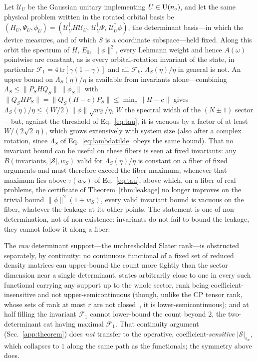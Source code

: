 %
%
%
%
%
%
%
%
%
%
%
%
%
%
%
%
\begin{proposition}
\label{prop:leakinv}
Let $\mathcal U_U$ be the Gaussian unitary implementing $U\in\mathrm U(n_{\rm o})$, and let the same
physical problem written in the rotated orbital basis be
$(H_U,\Psi_U,\phi_U)=(\mathcal U_U^{\dagger}H\mathcal U_U,\,\mathcal U_U^{\dagger}\Psi,\,
\mathcal U_U^{\dagger}\phi)$, the determinant basis---in which the device measures, and of which $S$ is a
coordinate subspace---held fixed. Along this orbit the spectrum of $H$, $E_0$, $\lVert\phi\rVert^{2}$,
every Lehmann weight and hence $A(\omega)$ pointwise are constant, as is every orbital-rotation invariant
of the state, in particular $\mathcal F_1=4\,\mathrm{tr}[\gamma(1-\gamma)]$ and all
$\mathcal F_k$. $\Lambda_S(\eta)/\eta$ in general is not. An upper bound on $\Lambda_S(\eta)/\eta$ is available from
invariants alone---combining $\Lambda_S\le\lVert P_SHQ_S\rVert\,\lVert\phi_S\rVert$ with
$\lVert Q_SHP_S\rVert=\lVert Q_S(H-c)P_S\rVert\le\min_c\lVert H-c\rVert$ gives
$\Lambda_S(\eta)/\eta\le(W/2)\lVert\phi\rVert\sqrt{w_S}/\eta$, $W$ the spectral width of the $(N\pm1)$
sector---but, against the threshold of Eq.~\eqref{eq:tau}, it is vacuous by a factor of at least
$W/(2\sqrt2\,\eta)$, which grows extensively with system size (also after a complex rotation, since
$\tilde\Lambda_S$ of Eq.~\eqref{eq:lambdatilde} obeys the same bound).
That no invariant bound can be useful on these fibers is seen at fixed invariants: any
$B(\text{invariants},|\mathcal S|,w_S)$ valid for $\Lambda_S(\eta)/\eta$ is constant on a fiber of fixed
arguments and must therefore exceed the fiber maximum; whenever that maximum lies above
$\tau(w_S)$ of Eq.~\eqref{eq:tau}, above which, on a fiber of real problems, the certificate of
Theorem~\ref{thm:leakage} no longer improves on the trivial bound $\lVert\phi\rVert^{2}(1+w_S)$, every valid invariant bound is
vacuous on the fiber, whatever the leakage at its other points. The statement is one of
non-determination, not of non-existence: invariants do not fail to bound the leakage, they cannot follow
it along a fiber.
\end{proposition}

The \emph{raw} determinant support---the unthresholded Slater rank---is obstructed separately, by
continuity: no continuous functional of a fixed set of reduced density matrices can upper-bound the
count more tightly than the sector dimension near a single determinant, states arbitrarily close to one
in every such functional carrying any support up to the whole sector, rank being coefficient-insensitive and
not upper-semicontinuous (though, unlike the CP tensor rank, whose sets of rank at most $r$ are not
closed~\cite{desilvalim2008}, it is lower-semicontinuous); and
at half filling the invariant $\mathcal F_1$ cannot lower-bound the count beyond $2$, the two-determinant
cat having maximal $\mathcal F_1$. That continuity argument (Sec.~\ref{app:theorem}) does \emph{not}
transfer to the operative, coefficient-\emph{sensitive} $|\mathcal S|_{\varepsilon_w}$, which collapses to $1$ along the same
path as the functionals; the symmetry above does.

